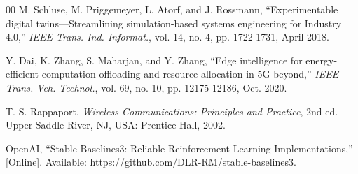 \documentclass[conference]{IEEEtran}
\begin{document}
\begin{thebibliography}{00}
 M. Schluse, M. Priggemeyer, L. Atorf, and J. Rossmann, ``Experimentable digital twins—Streamlining simulation-based systems engineering for Industry 4.0,'' \textit{IEEE Trans. Ind. Informat.}, vol. 14, no. 4, pp. 1722-1731, April 2018.

 Y. Dai, K. Zhang, S. Maharjan, and Y. Zhang, ``Edge intelligence for energy-efficient computation offloading and resource allocation in 5G beyond,'' \textit{IEEE Trans. Veh. Technol.}, vol. 69, no. 10, pp. 12175-12186, Oct. 2020.

 T. S. Rappaport, \textit{Wireless Communications: Principles and Practice}, 2nd ed. Upper Saddle River, NJ, USA: Prentice Hall, 2002.

 OpenAI, ``Stable Baselines3: Reliable Reinforcement Learning Implementations,'' [Online]. Available: https://github.com/DLR-RM/stable-baselines3.

\end{thebibliography}
\end{document}
